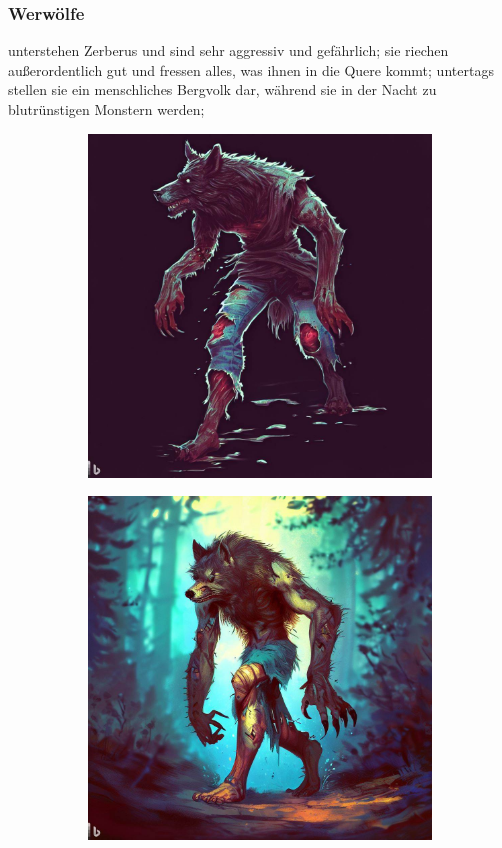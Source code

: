 \documentclass[11pt, twoside]{article}
\begin{document}
\subsubsection{Werwölfe\label{werwolf}}
\label{sec:orga0bb00a}
unterstehen Zerberus und sind sehr aggressiv und gefährlich; sie riechen außerordentlich gut und fressen alles, was ihnen in die Quere kommt; untertags stellen sie ein menschliches Bergvolk dar, während sie in der Nacht zu blutrünstigen Monstern werden;
\begin{figure}[H]
\centering
\caption{Werwolf}
\label{fig:wolf}
  \begin{subfigure}{0.3\textwidth}
    \centering
    \includegraphics[width=0.99\linewidth]{wolf1.jpeg}
  \end{subfigure}%
  \begin{subfigure}{0.3\textwidth}
    \centering
    \includegraphics[width=0.99\linewidth]{wolf2.jpeg}

\end{subfigure}
\end{figure}
\end{document}
